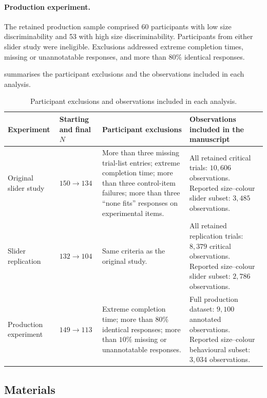 \documentclass[10pt,a4paper,fleqn]{article}
\begin{document}
\paragraph{Production experiment.}
The retained production sample comprised 60 participants with low size discriminability and 53 with high size discriminability.
Participants from either slider study were ineligible.
Exclusions addressed extreme completion times, missing or unannotatable responses, and more than $80\%$ identical responses.

 summarises the participant exclusions and the observations included in each analysis.

\begin{table}[H]
\centering
\caption{Participant exclusions and observations included in each analysis.}
\label{tab:exclusion-transparency}
\footnotesize
\setlength{\tabcolsep}{3pt}
\renewcommand{\arraystretch}{0.96}
\begin{tabularx}{\textwidth}{>{\raggedright\arraybackslash}p{2.0cm}>{\raggedright\arraybackslash}p{2.5cm}>{\raggedright\arraybackslash}p{5.7cm}>{\raggedright\arraybackslash}X}
\hline
Experiment & Starting and final $N$ & Participant exclusions & Observations included in the manuscript \\
\hline
Original slider study & $150 \rightarrow 134$ & More than three missing trial-list entries; extreme completion time; more than three control-item failures; more than three ``none fits'' responses on experimental items.
& All retained critical trials: $10{,}606$ observations.
Reported size--colour slider subset: $3{,}485$ observations. \\
Slider replication & $132 \rightarrow 104$ & Same criteria as the original study.
& All retained replication trials: $8{,}379$ critical observations.
Reported size--colour slider subset: $2{,}786$ observations. \\
Production experiment & $149 \rightarrow 113$ & Extreme completion time; more than $80\%$ identical responses; more than $10\%$ missing or unannotatable responses.
& Full production dataset: $9{,}100$ annotated observations.
Reported size--colour behavioural subset: $3{,}034$ observations. \\
\hline
\end{tabularx}
\end{table}

\subsection{Materials}
\end{document}
